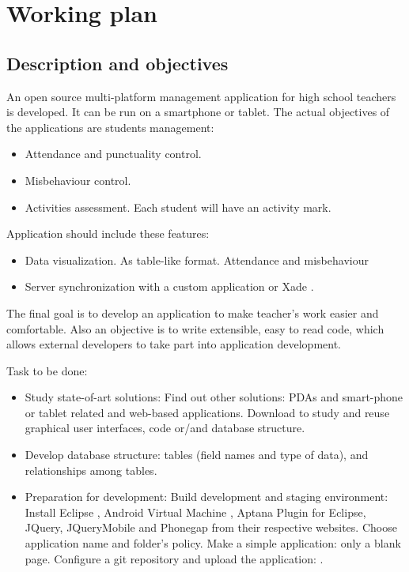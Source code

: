 \chapter{Working plan}
\section{Description and objectives}

	An open source multi-platform management application for high school teachers is developed. It can be run on a smartphone or tablet. 
	The actual objectives of the applications are students management:
	\begin{itemize}
	  \item Attendance and punctuality control. 
	  \item Misbehaviour control.
	  \item Activities assessment. Each student will have an activity mark.
	\end{itemize}

	Application should include these features:
	\begin{itemize}
	  \item Data visualization. As table-like format. Attendance and misbehaviour
	  \item Server synchronization with a custom application or Xade \cite{Xade}.
	\end{itemize}

	The final goal is to develop an application to make teacher's work easier and comfortable. 
	Also an objective is to write extensible, easy to read code, which allows external developers to take part into application development.
	

	Task to be done:
	\begin{itemize}
	  \item Study state-of-art solutions: 
  \subitem  Find out other solutions: PDAs and smart-phone or tablet related and web-based applications.
  \subitem  Download to study and reuse graphical user interfaces, code or/and database structure. 
  \item   Develop database structure: tables (field names and type of data), and relationships among tables. 
  \item   Preparation for development:
\subitem  Build development and staging environment: 
\subsubitem Install Eclipse \cite{Eclipse}, Android Virtual Machine \cite{AndroidDevelopmentKit}, Aptana Plugin for Eclipse, JQuery, JQueryMobile \cite{JQueryMobile} and Phonegap \cite{PhoneGap} from their respective websites.
\subitem   Choose application name and folder's policy.
\subitem   Make a simple application: only a blank page.
\subitem  Configure a git repository and upload the application: \cite{EduXes}.
	\end{itemize}
	
